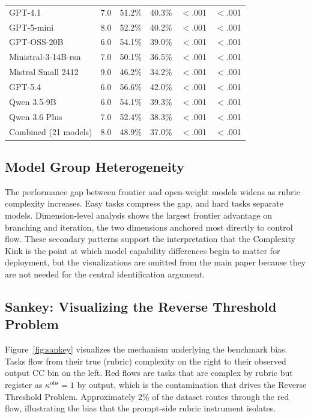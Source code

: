 \documentclass{article}
\begin{document}
\begin{table}[h]
\begin{tabular}{@{}lrrrrr@{}}
GPT-4.1                  & 7.0  & 51.2\% & 40.3\% & $<$.001 & $<$.001 \\
GPT-5-mini               & 8.0  & 52.2\% & 40.2\% & $<$.001 & $<$.001 \\
GPT-OSS-20B              & 6.0  & 54.1\% & 39.0\% & $<$.001 & $<$.001 \\
Ministral-3-14B-rsn      & 7.0  & 50.1\% & 36.5\% & $<$.001 & $<$.001 \\
Mistral Small 2412       & 9.0  & 46.2\% & 34.2\% & $<$.001 & $<$.001 \\
GPT-5.4                  & 6.0  & 56.6\% & 42.0\% & $<$.001 & $<$.001 \\
Qwen 3.5-9B              & 6.0  & 54.1\% & 39.3\% & $<$.001 & $<$.001 \\
Qwen 3.6 Plus            & 7.0  & 52.4\% & 38.3\% & $<$.001 & $<$.001 \\
\midrule
Combined (21 models)     & 8.0  & 48.9\% & 37.0\% & $<$.001 & $<$.001 \\
\bottomrule
\end{tabular}
\end{table}

\subsection{Model Group Heterogeneity}

The performance gap between frontier and open-weight models widens as rubric complexity increases. Easy tasks compress the gap, and hard tasks separate models. Dimension-level analysis shows the largest frontier advantage on branching and iteration, the two dimensions anchored most directly to control flow. These secondary patterns support the interpretation that the Complexity Kink is the point at which model capability differences begin to matter for deployment, but the visualizations are omitted from the main paper because they are not needed for the central identification argument.

\subsection{Sankey: Visualizing the Reverse Threshold Problem}

Figure~\ref{fig:sankey} visualizes the mechanism underlying the benchmark bias. Tasks flow from their true (rubric) complexity on the right to their observed output CC bin on the left. Red flows are tasks that are complex by rubric but register as $\kappa^{\text{obs}}=1$ by output, which is the contamination that drives the Reverse Threshold Problem. Approximately 2\% of the dataset routes through the red flow, illustrating the bias that the prompt-side rubric instrument isolates.
\end{document}
